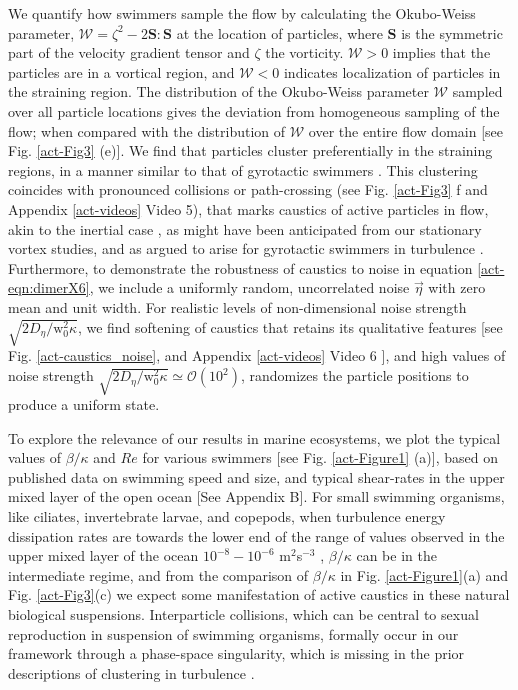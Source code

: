\documentclass[../Rajarshi-thesis-draft.tex]{subfiles}
\begin{document}
We quantify how swimmers sample the flow by calculating the Okubo-Weiss parameter, $\mathcal{W} = \zeta^2 - 2 \mathbf{S}:\mathbf{S}$ at the location of particles, where $\mathbf{S}$ is the symmetric part of the velocity gradient tensor \cite{Jason2018} and $\zeta$ the vorticity. $\mathcal{W}>0$ implies that the particles are in a vortical region, and $\mathcal{W}<0$ indicates localization of particles in the straining region. The distribution of the Okubo-Weiss parameter $\mathcal{W}$ sampled over all particle locations gives the deviation from homogeneous sampling of the flow; when compared with the distribution of $\mathcal{W}$ over the entire flow domain [see Fig. \ref{act-Fig3} (e)]. We find that particles cluster preferentially in the straining regions, in a manner similar to that of gyrotactic swimmers \cite{Durham2013, PhysRevLett.116.108104}. This clustering coincides with pronounced collisions or path-crossing (see Fig. \ref{act-Fig3} f and Appendix \ref{act-videos} Video 5), that marks caustics of active particles in flow, akin to the inertial case \cite{Wilkinson_2005}, as might have been anticipated from our stationary vortex studies, and as argued to arise for gyrotactic swimmers in turbulence \cite{PhysRevLett.116.108104}. Furthermore, to demonstrate the robustness of caustics to noise in equation \eqref{act-eqn:dimerX6}, we include a uniformly random, uncorrelated noise $\vec{\eta}$ with zero mean and unit width. For realistic levels of non-dimensional noise strength $\sqrt{2D_\eta/\mathrm{w}_{0}^2\kappa}$, we find softening of caustics that retains its qualitative features [see Fig. \ref{act-caustics_noise}, and Appendix \ref{act-videos} Video 6 ], and high values of noise strength $\sqrt{2D_\eta/\mathrm{w}_{0}^2\kappa} \simeq \mathcal{O}(10^{2})$, randomizes the particle positions to produce a uniform state.

To explore the relevance of our results in marine ecosystems, we plot the typical values of $\beta/\kappa$ and $Re$ for various swimmers [see Fig. \ref{act-Figure1} (a)], based on published data on swimming speed and size, and typical shear-rates in the upper mixed layer of the open ocean \cite{StockerARFM2012} [See Appendix B]. For small swimming organisms, like ciliates, invertebrate larvae, and copepods, when turbulence energy dissipation rates are towards the lower end of the range of values observed in the upper mixed layer of the ocean  $10^{-8} - 10^{-6}$ m$^{2}$s$^{-3}$ \cite{StockerARFM2012}, $\beta/\kappa$ can be in the intermediate regime, and from the comparison of $\beta/\kappa$ in Fig. \ref{act-Figure1}(a) and Fig. \ref{act-Fig3}(c) we expect some manifestation of active caustics in these natural biological suspensions. Interparticle collisions, which can be central to sexual reproduction in suspension of swimming organisms, formally occur in our framework through a phase-space singularity, which is missing in the prior descriptions of clustering in turbulence \cite{Durham2013, Zhan2014}.
\end{document}
